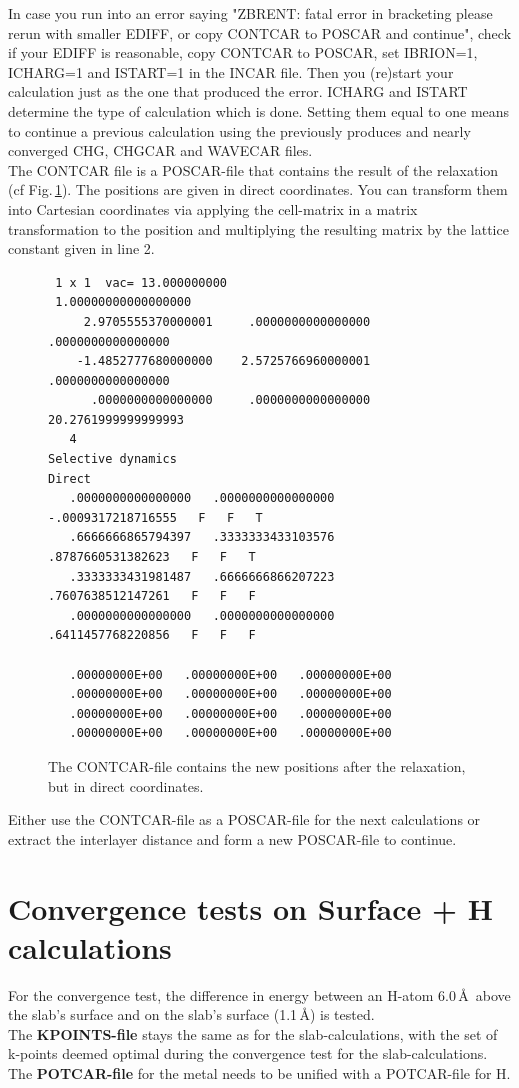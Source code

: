 \documentclass[twoside, 11pt, titlepage, captions=nooneline, a4paper, headsepline]{scrbook}%
\begin{document}
In case you run into an error saying "ZBRENT: fatal error in bracketing please rerun with smaller EDIFF, or copy CONTCAR to POSCAR and continue", check if your EDIFF is reasonable, copy CONTCAR to POSCAR, set IBRION=1, ICHARG=1 and ISTART=1 in the INCAR file. Then you (re)start your calculation just as the one that produced the error. ICHARG and ISTART determine the type of calculation which is done. Setting them equal to one means to continue a previous calculation using the previously produces and nearly converged CHG, CHGCAR and WAVECAR files.\\
The CONTCAR file is a POSCAR-file that contains the result of the relaxation (cf Fig.\,\ref{contcar}). The positions are given in direct coordinates. You can transform them into Cartesian coordinates via applying the cell-matrix in a matrix transformation to the position and multiplying the resulting matrix by the lattice constant given in line 2.
\begin{figure}[h!!]
\begin{verbatim}
 1 x 1  vac= 13.000000000
 1.00000000000000000
     2.9705555370000001     .0000000000000000     .0000000000000000
    -1.4852777680000000    2.5725766960000001     .0000000000000000
      .0000000000000000     .0000000000000000   20.2761999999999993
   4
Selective dynamics
Direct
   .0000000000000000   .0000000000000000  -.0009317218716555   F   F   T
   .6666666865794397   .3333333433103576   .8787660531382623   F   F   T
   .3333333431981487   .6666666866207223   .7607638512147261   F   F   F
   .0000000000000000   .0000000000000000   .6411457768220856   F   F   F

   .00000000E+00   .00000000E+00   .00000000E+00
   .00000000E+00   .00000000E+00   .00000000E+00
   .00000000E+00   .00000000E+00   .00000000E+00
   .00000000E+00   .00000000E+00   .00000000E+00

\end{verbatim}
\caption{The CONTCAR-file contains the new positions after the relaxation, but in direct coordinates.}
\label{contcar}
\end{figure}
Either use the CONTCAR-file as a POSCAR-file for the next calculations or extract the interlayer distance and form a new POSCAR-file to continue.

\section{Convergence tests on Surface + H calculations}
\label{H+slab}
For the convergence test, the difference in energy between an H-atom 6.0\,\AA~above the slab's surface and on the slab's surface (1.1\,\AA) is tested. \\
The \textbf{KPOINTS-file} stays the same as for the slab-calculations, with the set of k-points deemed optimal during the convergence test for the slab-calculations. 
The \textbf{POTCAR-file} for the metal needs to be unified with a POTCAR-file for H.
\end{document}
